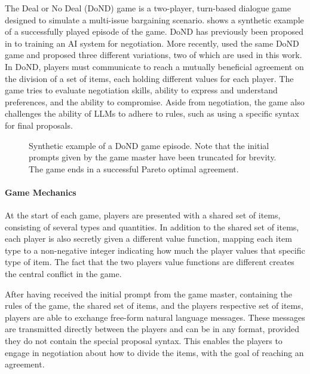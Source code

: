 The Deal or No Deal (DoND) game is a two-player, turn-based dialogue game designed to simulate a multi-issue bargaining scenario.  shows a synthetic example of a successfully played episode of the game. DoND has previously been proposed in \cite{lewis-etal-2017-deal} to training an AI system for negotiation. More recently, \cite{DBLP:journals/corr/abs-2406-18872} used the same DoND game and proposed three different variations, two of which are used in this work.
In DoND, players must communicate to reach a mutually beneficial agreement on the division of a set of items, each holding different values for each player. The game tries to evaluate negotiation skills, ability to express and understand preferences, and the ability to compromise. Aside from negotiation, the game also challenges the ability of LLMs to adhere to rules, such as using a specific syntax for final proposals.


\begin{figure}[ht]
  \centering
  
  \caption{Synthetic example of a DoND game episode. Note that the initial prompts given by the game master have been truncated for brevity. The game ends in a successful Pareto optimal agreement.}
  \label{fig:dond_example}
\end{figure}


\paragraph{Game Mechanics}

At the start of each game, players are presented with a shared set of items, consisting of several types and quantities. In addition to the shared set of items, each player is also secretly given a different value function, mapping each item type to a non-negative integer indicating how much the player values that specific type of item. The fact that the two players value functions are different creates the central conflict in the game.

After having received the initial prompt from the game master, containing the rules of the game, the shared set of items, and the players respective set of items, players are able to exchange free-form natural language messages. These messages are transmitted directly between the players and can be in any format, provided they do not contain the special proposal syntax. This enables the players to engage in negotiation about how to divide the items, with the goal of reaching an agreement.

